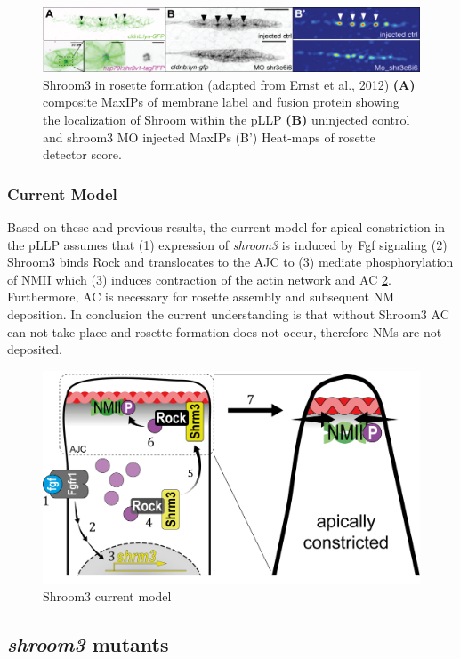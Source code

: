 \documentclass[11pt,singlespacinge,twoside]{reedthesis} %
\begin{document}
\begin{figure}

{\centering \includegraphics[width=.95\textwidth]{figures/intro/shrm_ernst} 

}

\caption[Shroom3 in rosette formation]{Shroom3 in rosette formation (adapted from Ernst et al., 2012) \textbf{(A)} composite MaxIPs of membrane label and fusion protein showing the localization of Shroom within the pLLP \textbf{(B)} uninjected control and shroom3 MO injected MaxIPs (B') Heat-maps of rosette detector score.}\label{fig:shrmernst}
\end{figure}
\hypertarget{current-model}{%
\subsubsection{Current Model}\label{current-model}}

Based on these and previous results, the current model for apical constriction in the pLLP assumes that (1) expression of \emph{shroom3} is induced by Fgf signaling (2) Shroom3 binds Rock and translocates to the AJC to (3) mediate phosphorylation of NMII which (3) induces contraction of the actin network and AC \ref{fig:shrmmodel}. Furthermore, AC is necessary for rosette assembly and subsequent NM deposition. In conclusion the current understanding is that without Shroom3 AC can not take place and rosette formation does not occur, therefore NMs are not deposited.


\begin{figure}

{\centering \includegraphics[width=.70\textwidth]{figures/intro/shrm_model} 

}

\caption{Shroom3 current model}\label{fig:shrmmodel}
\end{figure}
\hypertarget{shroom3-mutants}{%
\subsection{\texorpdfstring{\emph{shroom3} mutants}{shroom3 mutants}}\label{shroom3-mutants}}
\end{document}
